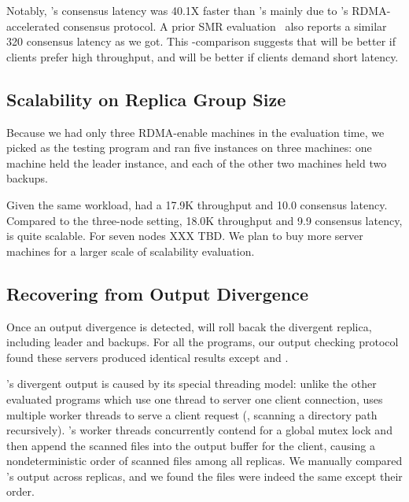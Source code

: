 Notably, \xxx's consensus latency was 40.1X faster than \zookeeper's mainly due 
to \xxx's RDMA-accelerated consensus protocol. A prior SMR
evaluation~\cite{dare:hpdc15} also reports a similar 320 \us \zookeeper 
consensus latency as we got. This \xxx-\calvin comparison suggests that \calvin 
will be better if clients prefer high throughput, and \xxx will be better if 
clients demand short latency.



\subsection{Scalability on Replica Group Size} \label{sec:scalability}


Because we had only three RDMA-enable machines in the evaluation time, we 
picked \redis as the testing program and ran five \xxx instances on three 
machines: one machine held the leader instance, and each of the other two 
machines held two backups.

Given the same \redis workload, \xxx had a 17.9K throughput and 10.0 \us 
consensus latency. Compared to the three-node setting, 18.0K throughput and 9.9 
\us consensus latency, \xxx is quite scalable. For seven nodes XXX TBD. We plan 
to buy more server machines for a larger scale of scalability evaluation.





\subsection{Recovering from Output Divergence} \label{sec:robust}

Once an output divergence is detected, \xxx will roll bacak the divergent 
replica, including leader and backups. For all the \nprog programs, our output 
checking protocol found these servers produced identical results except \clamav 
and \ssdb.

\clamav's divergent output is caused by its special threading model: 
unlike the other evaluated programs which use one thread to server one client 
connection, \clamav uses multiple worker threads to serve a client request 
(\eg, scanning a directory path recursively). \xxx's worker threads 
concurrently contend for a global mutex lock and then append the scanned 
files into the output buffer for the client, causing a nondeterministic order 
of scanned files among all replicas. We manually compared \clamav's output 
across replicas, and we found the files were indeed the same except their order.

